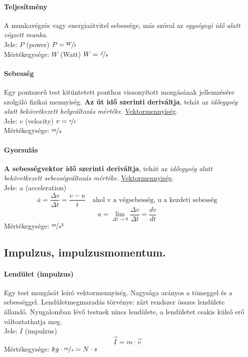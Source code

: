 \paragraph{Teljesítmény}
A munkavégzés vagy energiaátvitel sebessége, más szóval az \emph{egységnyi idő alatt végzett munka}.\\
Jele: $P$ (power) \quad $P = \nicefrac{W}{t}$\\
Mértékegysége: $W$ (Watt) \quad $W = \nicefrac{J}{s}$

\paragraph{Sebesség}
Egy pontszerű test kitüntetett ponthoz viszonyított mozgásának jellemzésére szolgáló fizikai mennyiség. \textbf{Az út idő szerinti deriváltja}, tehát az \emph{időegység alatt bekövetkezett helyváltozás mértéke}. \underline{Vektormennyiség}.\\
Jele: $v$ (velocity) \quad $v = \nicefrac{s}{t}$\\
Mértékegysége: $\nicefrac{m}{s}$

\paragraph{Gyorsulás}
\textbf{A sebességvektor idő szerinti deriváltja}, tehát az \emph{időegység alatt bekövetkezett sebességváltozás mértéke}. \underline{Vektormennyiség}.\\
Jele: $a$ (acceleration) 
$$\overline{a}=\frac{\Delta v}{\Delta t} = \frac{v-u}{t}\quad \text{ahol v a végsebesség, u a kezdeti sebesség}$$
$$a=\lim\limits_{\Delta t \to 0} \frac{\Delta v}{\Delta t} = \frac{dv}{dt}$$
Mértékegysége: $\nicefrac{m}{s^2}$

\subsection{Impulzus, impulzusmomentum.}
\paragraph{Lendület (impulzus)}
Egy test mozgását leíró vektormennyiség. Nagysága arányos a tömeggel és a sebességgel. Lendületmegmaradás törvénye: zárt rendszer összes lendülete állandó. Nyugalomban lévő testnek nincs lendülete, a lendületet csakis külső erő változtathatja meg.\\
Jele: $I$ (impulzus)	$$\vec{I}=m\cdot \vec{v}$$
Mértékegysége: $kg\cdot \nicefrac{m}{s} = N \cdot s$

